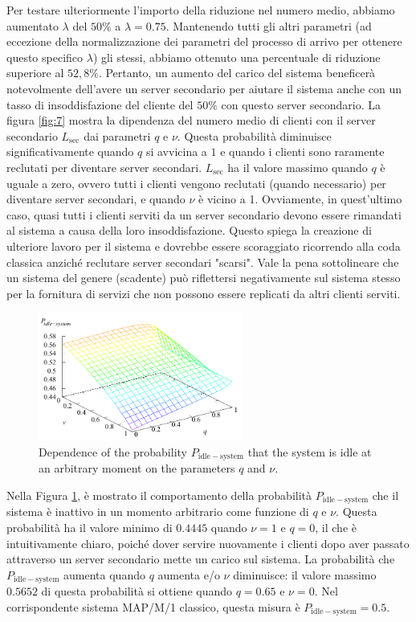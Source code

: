 \documentclass[11pt]{article}
\begin{document}
Per testare ulteriormente l'importo della riduzione nel numero medio, abbiamo aumentato $\lambda$ del $50\%$ a $\lambda = 0.75$. Mantenendo tutti gli altri parametri (ad eccezione della normalizzazione dei parametri del processo di arrivo per ottenere questo specifico $\lambda$) gli stessi, abbiamo ottenuto una percentuale di riduzione superiore al $52,8\%$. Pertanto, un aumento del carico del sistema beneficerà notevolmente dell'avere un server secondario per aiutare il sistema anche con un tasso di insoddisfazione del cliente del $50\%$ con questo server secondario.
La figura \ref{fig:7} mostra la dipendenza del numero medio di clienti con il server secondario $L_\mathrm{sec}$ dai parametri $q$ e $\nu$. Questa probabilità diminuisce significativamente quando $q$ si avvicina a $1$ e quando i clienti sono raramente reclutati per diventare server secondari. $L_\mathrm{sec}$ ha il valore massimo quando $q$ è uguale a zero, ovvero tutti i clienti vengono reclutati (quando necessario) per diventare server secondari, e quando $\nu$ è vicino a 1. Ovviamente, in quest'ultimo caso, quasi tutti i clienti serviti da un server secondario devono essere rimandati al sistema a causa della loro insoddisfazione. Questo spiega la creazione di ulteriore lavoro per il sistema e dovrebbe essere scoraggiato ricorrendo alla coda classica anziché reclutare server secondari "scarsi". Vale la pena sottolineare che un sistema del genere (scadente) può riflettersi negativamente sul sistema stesso per la fornitura di servizi che non possono essere replicati da altri clienti serviti.

\begin{figure}[h!]
    \centering
    \includegraphics[width=0.6\textwidth]{3zlg6uj.png}
    \caption{Dependence of the probability $P_\mathrm{idle-system}$ that the system is idle at an arbitrary moment on the parameters $q$ and $\nu$.}
    \label{fig:8}
\end{figure}

Nella Figura \ref{fig:8}, è mostrato il comportamento della probabilità $P_\mathrm{idle-system}$ che il sistema è inattivo in un momento arbitrario come funzione di $q$ e $\nu$. Questa probabilità ha il valore minimo di $0.4445$ quando $\nu = 1$ e $q = 0$, il che è intuitivamente chiaro, poiché dover servire nuovamente i clienti dopo aver passato attraverso un server secondario mette un carico sul sistema. La probabilità che $P_\mathrm{idle-system}$ aumenta quando $q$ aumenta e/o $\nu$ diminuisce: il valore massimo $0.5652$ di questa probabilità si ottiene quando $q = 0.65$ e $\nu = 0$. Nel corrispondente sistema MAP/M/1 classico, questa misura è $P_\mathrm{idle-system} = 0.5$.
\end{document}
